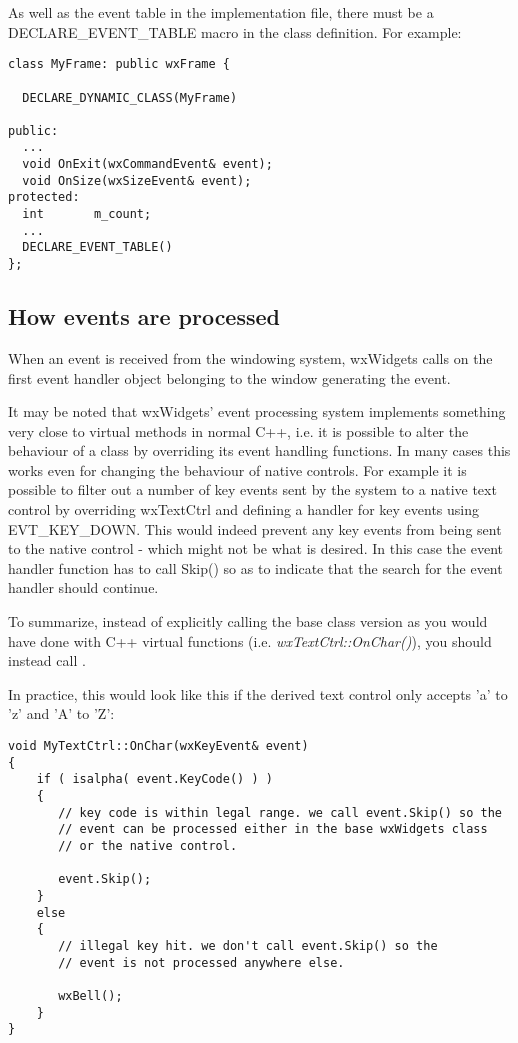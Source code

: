 As well as the event table in the implementation file, there must be a DECLARE\_EVENT\_TABLE
macro in the class definition. For example:

{\small%
\begin{verbatim}
class MyFrame: public wxFrame {

  DECLARE_DYNAMIC_CLASS(MyFrame)

public:
  ...
  void OnExit(wxCommandEvent& event);
  void OnSize(wxSizeEvent& event);
protected:
  int       m_count;
  ...
  DECLARE_EVENT_TABLE()
};
\end{verbatim}
}%

\subsection{How events are processed}\label{eventprocessing}

When an event is received from the windowing system, wxWidgets calls 
 on the first
event handler object belonging to the window generating the event.

It may be noted that wxWidgets' event processing system implements something
very close to virtual methods in normal C++, i.e. it is possible to alter
the behaviour of a class by overriding its event handling functions. In
many cases this works even for changing the behaviour of native controls.
For example it is possible to filter out a number of key events sent by the
system to a native text control by overriding wxTextCtrl and defining a
handler for key events using EVT\_KEY\_DOWN. This would indeed prevent
any key events from being sent to the native control - which might not be
what is desired. In this case the event handler function has to call Skip()
so as to indicate that the search for the event handler should continue.

To summarize, instead of explicitly calling the base class version as you
would have done with C++ virtual functions (i.e. {\it wxTextCtrl::OnChar()}),
you should instead call .

In practice, this would look like this if the derived text control only
accepts 'a' to 'z' and 'A' to 'Z':

{\small%
\begin{verbatim}
void MyTextCtrl::OnChar(wxKeyEvent& event)
{
    if ( isalpha( event.KeyCode() ) )
    {
       // key code is within legal range. we call event.Skip() so the
       // event can be processed either in the base wxWidgets class
       // or the native control.

       event.Skip();
    }
    else
    {
       // illegal key hit. we don't call event.Skip() so the
       // event is not processed anywhere else.

       wxBell();
    }
}
\end{verbatim}
}%


